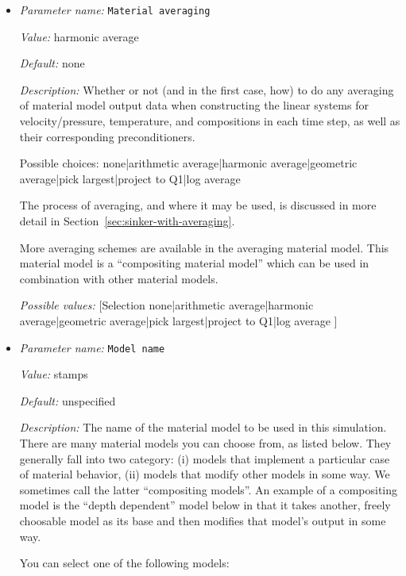 \begin{itemize}
\item {\it Parameter name:} {\tt Material averaging}
\label{parameters:Material model/Material averaging}


{\it Value:} harmonic average


{\it Default:} none


{\it Description:} Whether or not (and in the first case, how) to do any averaging of material model output data when constructing the linear systems for velocity/pressure, temperature, and compositions in each time step, as well as their corresponding preconditioners.

Possible choices: none|arithmetic average|harmonic average|geometric average|pick largest|project to Q1|log average

The process of averaging, and where it may be used, is discussed in more detail in Section~\ref{sec:sinker-with-averaging}.

More averaging schemes are available in the averaging material model. This material model is a ``compositing material model'' which can be used in combination with other material models.


{\it Possible values:} [Selection none|arithmetic average|harmonic average|geometric average|pick largest|project to Q1|log average ]
\item {\it Parameter name:} {\tt Model name}
\label{parameters:Material model/Model name}


{\it Value:} stamps


{\it Default:} unspecified


{\it Description:} The name of the material model to be used in this simulation. There are many material models you can choose from, as listed below. They generally fall into two category: (i) models that implement a particular case of material behavior, (ii) models that modify other models in some way. We sometimes call the latter ``compositing models''. An example of a compositing model is the ``depth dependent'' model below in that it takes another, freely choosable model as its base and then modifies that model's output in some way.

You can select one of the following models:


\end{itemize}
